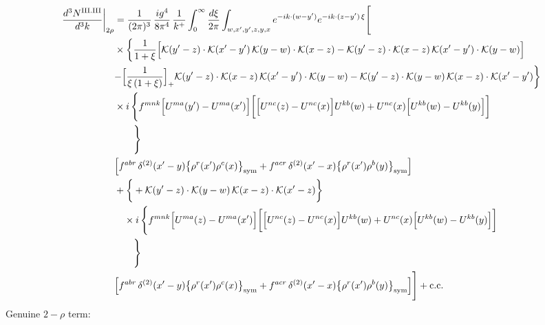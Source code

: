 \documentclass[9pt]{article}
\numberwithin{equation}{section}
\begin{document}
\begin{align}
\frac{d^{3}N^{\rm III.III}}{d^{3}k}\bigg|_{2\rho}&=\frac{1}{(2\pi)^{3}}\,\frac{ig^{4}}{8\pi^{4}}\,\frac{1}{k^{+}}\int_{0}^{\infty}\frac{d\xi}{2\pi}\int_{w,x',y',z,y,x}e^{-ik\cdot(w-y')}e^{-ik\cdot(z-y')\,\xi}\Bigg[\notag\\
&\times\bigg\{\frac{1}{1+\xi}\Big[\mathcal{K}(y'-z)\cdot\mathcal{K}(x'-y')\,\mathcal{K}(y-w)\cdot\mathcal{K}(x-z)-\mathcal{K}(y'-z)\cdot\mathcal{K}(x-z)\,\mathcal{K}(x'-y')\cdot\mathcal{K}(y-w)\Big]\notag\\
&{-\Big[\frac{1}{\xi\,(1+\xi)}\Big]_{+}\mathcal{K}(y'-z)\cdot\mathcal{K}(x-z)\,\mathcal{K}(x'-y')\cdot\mathcal{K}(y-w)}-\mathcal{K}(y'-z)\cdot\mathcal{K}(y-w)\,\mathcal{K}(x-z)\cdot\mathcal{K}(x'-y')\bigg\}\notag\\
&\times i\,\Bigg\{f^{mnk}\Big[U^{ma}(y')-U^{ma}(x')\Big]\bigg[\Big[U^{nc}(z)-U^{nc}(x)\Big]U^{kb}(w)+U^{nc}(x)\Big[U^{kb}(w)-U^{kb}(y)\Big]\bigg]\notag\\&\qquad\Bigg\}\notag \\ & \Big[f^{abr}\,\delta^{(2)}(x'-y)\big\{\rho^{r}(x')\rho^{c}(x)\big\}_{\rm sym} +f^{acr}\,\delta^{(2)}(x'-x)\big\{\rho^{r}(x')\rho^{b}(y)\big\}_{\rm sym}\Big]\notag\\
&+\bigg\{+\mathcal{K}(y'-z)\cdot\mathcal{K}(y-w)\,\mathcal{K}(x-z)\cdot\mathcal{K}(x'-z)\bigg\}\notag\\&\quad\times i\,\Bigg\{f^{mnk}\Big[U^{ma}(z)-U^{ma}(x')\Big]\bigg[\Big[U^{nc}(z)-U^{nc}(x)\Big]U^{kb}(w)+U^{nc}(x)\Big[U^{kb}(w)-U^{kb}(y)\Big]\bigg]\notag\\&\qquad\Bigg\}\notag \\ & \Big[f^{abr}\,\delta^{(2)}(x'-y)\big\{\rho^{r}(x')\rho^{c}(x)\big\}_{\rm sym} +f^{acr}\,\delta^{(2)}(x'-x)\big\{\rho^{r}(x')\rho^{b}(y)\big\}_{\rm sym}\Big]\Bigg]+{\rm c.c.}\label{eq:H-III.III-2}
\end{align}
Genuine $2-\rho$ term:
\end{document}

